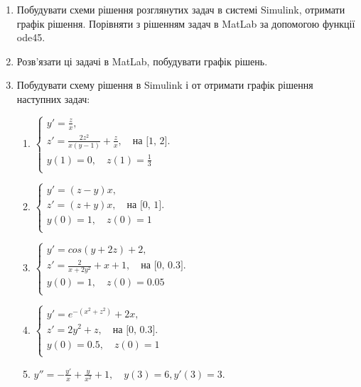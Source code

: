 \documentclass[a4paper, 10pt]{article}
\begin{document}
\begin{enumerate}
\item Побудувати схеми рішення розглянутих задач в системі Simulink, отримати графік рішення. Порівняти з рішенням задач в MatLab за допомогою функції ode45. 
\item Розв’язати ці задачі в MatLab, побудувати графік рішень. 
\item{Побудувати схему рішення в Simulink і от отримати графік рішення наступних задач:}
	\begin{enumerate}
		\item{$
			\left\{\begin{array}{l}
				y'=\frac{z}{x},\\
				z'=\frac{2z^{2}}{x(y-1)}+\frac{z}{x},\quad\textrm{на [1, 2]}.\\
				y(1)=0,\quad z(1)=\frac{1}{3}\\
			\end{array}\right.
		$}

		\item{$
			\left\{\begin{array}{l}
				y'=(z-y)x,\\
				z'=(z+y)x,\quad\textrm{на [0, 1]}.\\
				y(0)=1,\quad z(0)=1\\
			\end{array}\right.
		$}

		\item{$
			\left\{\begin{array}{l}
				y'=cos(y+2z)+2,\\
				z'=\frac{2}{x+2y^{2}}+x+1,\quad\textrm{на [0, 0.3]}.\\
				y(0)=1,\quad z(0)=0.05\\
			\end{array}\right.
		$}

		\item{$
			\left\{\begin{array}{l}
				y'=e^{-(x^{2}+z^{2})}+2x,\\
				z'=2y^{2}+z,\quad\textrm{на [0, 0.3]}.\\
				y(0)=0.5,\quad z(0)=1\\
			\end{array}\right.
		$}

		\item{$y''=-\frac{y'}{x}+\frac{y}{x^{2}}+1,\quad y(3)=6,y'(3)=3.$}
	\end{enumerate}
\end{enumerate}
\end{document}
